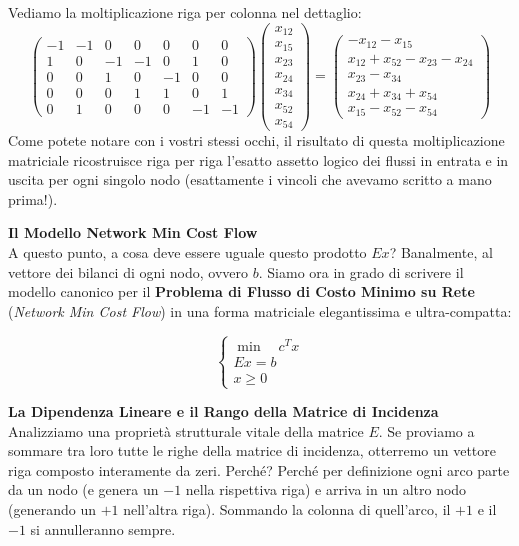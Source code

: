\documentclass[12pt, a4paper]{article}
\begin{document}
	Vediamo la moltiplicazione riga per colonna nel dettaglio:
	\[
	\begin{pmatrix}
		-1 & -1 & 0 & 0 & 0 & 0 & 0 \\ 
		1 & 0 & -1 & -1 & 0 & 1 & 0 \\ 
		0 & 0 & 1 & 0 & -1 & 0 & 0 \\ 
		0 & 0 & 0 & 1 & 1 & 0 & 1 \\ 
		0 & 1 & 0 & 0 & 0 & -1 & -1 
	\end{pmatrix}
	\begin{pmatrix}
		x_{12} \\ x_{15} \\ x_{23} \\ x_{24} \\ x_{34} \\ x_{52} \\ x_{54}
	\end{pmatrix}
	=
	\begin{pmatrix}
		-x_{12} - x_{15} \\
		x_{12} + x_{52} - x_{23} - x_{24} \\
		x_{23} - x_{34} \\
		x_{24} + x_{34} + x_{54} \\
		x_{15} - x_{52} - x_{54}
	\end{pmatrix}
	\]
	Come potete notare con i vostri stessi occhi, il risultato di questa moltiplicazione matriciale ricostruisce riga per riga l'esatto assetto logico dei flussi in entrata e in uscita per ogni singolo nodo (esattamente i vincoli che avevamo scritto a mano prima!). 
	
	\vspace{0.4cm}
	\textbf{Il Modello Network Min Cost Flow}\\
	A questo punto, a cosa deve essere uguale questo prodotto $Ex$? Banalmente, al vettore dei bilanci di ogni nodo, ovvero $b$. 
	Siamo ora in grado di scrivere il modello canonico per il \textbf{Problema di Flusso di Costo Minimo su Rete} (\textit{Network Min Cost Flow}) in una forma matriciale elegantissima e ultra-compatta:
	
	\[
	\begin{cases}
		\min \quad c^T x \\
		E x = b \\
		x \geq 0
	\end{cases}
	\]
	
	\vspace{0.4cm}
	\textbf{La Dipendenza Lineare e il Rango della Matrice di Incidenza}\\
	Analizziamo una proprietà strutturale vitale della matrice $E$. Se proviamo a sommare tra loro tutte le righe della matrice di incidenza, otterremo un vettore riga composto interamente da zeri. Perché? Perché per definizione ogni arco parte da un nodo (e genera un $-1$ nella rispettiva riga) e arriva in un altro nodo (generando un $+1$ nell'altra riga). Sommando la colonna di quell'arco, il $+1$ e il $-1$ si annulleranno sempre.
	
\end{document}
